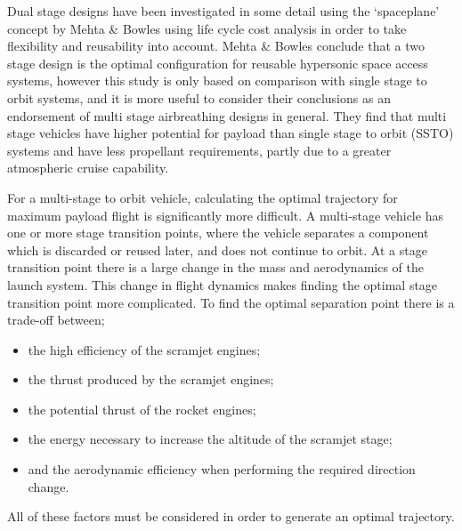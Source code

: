  Dual stage designs have been investigated in some detail using the `spaceplane' concept by Mehta \& Bowles\cite{Mehta2001} using life cycle cost analysis in order to take flexibility and reusability into account. Mehta \& Bowles conclude that a two stage design is the optimal configuration for reusable hypersonic space access systems, however this study is only based on comparison with single stage to orbit systems, and it is more useful to consider their conclusions as an endorsement of multi stage airbreathing designs in general. They find that multi stage vehicles have higher potential for payload than single stage to orbit (SSTO) systems and have less propellant requirements, partly due to a greater atmospheric cruise capability. 




For a multi-stage to orbit vehicle, calculating the optimal trajectory for maximum payload flight is significantly more difficult. A multi-stage vehicle has one or more stage transition points, where the vehicle separates a component which is discarded or reused later, and does not continue to orbit. At a stage transition point there is a large change in the mass and aerodynamics of the launch system. 
This change in flight dynamics makes finding the optimal stage transition point more complicated. To find the optimal separation point there is a trade-off between;
\begin{itemize}
	\item the high efficiency of the scramjet engines;
	\item the thrust produced by the scramjet engines;
	\item the potential thrust of the rocket engines;
	\item the energy necessary to increase the altitude of the scramjet stage;
	\item and the aerodynamic efficiency when performing the required direction change.
\end{itemize}
All of these factors must be considered in order to generate an optimal trajectory. 


